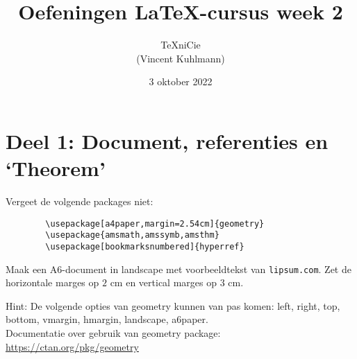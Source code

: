 \documentclass[a4paper]{article}
\title{Oefeningen \LaTeX-cursus week 2}
\author{\TeX niCie\\(Vincent Kuhlmann)}
\date{3 oktober 2022}
\begin{document}
    \maketitle


    \section{Deel 1: Document, referenties en `Theorem'}
    Vergeet de volgende packages niet:
    \begin{verbatim}
        \usepackage[a4paper,margin=2.54cm]{geometry}
        \usepackage{amsmath,amssymb,amsthm}
        \usepackage[bookmarksnumbered]{hyperref}
    \end{verbatim}
    \bigskip

    \begin{exercise}[Geometry]\label{ex:aaaa}
        Maak een A6-document in landscape met voorbeeldtekst van \nolinkurl{lipsum.com}. Zet de
        horizontale marges op $ 2\text{ cm} $ en vertical marges op $ 3\text{ cm} $.

        Hint: De volgende opties van geometry kunnen van pas komen: left, right, top, bottom,
        vmargin, hmargin, landscape, a6paper.\\
        Documentatie over gebruik van geometry package: \url{https://ctan.org/pkg/geometry}
    \end{exercise}


\end{document}
